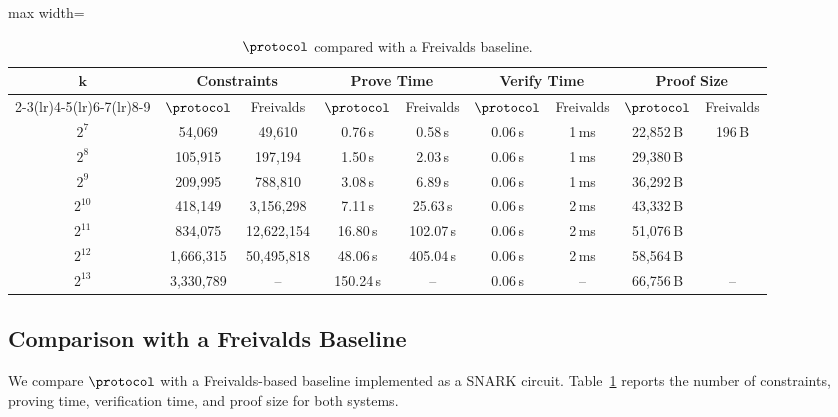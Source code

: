 \begin{table}[!t]
\centering
\setlength{\tabcolsep}{3.5pt}
\begin{adjustbox}{max width=\textwidth}
\begin{tabular}{c cc cc cc cc}
\toprule
\multirow{2}{*}{\(\boldsymbol{k}\)}
& \multicolumn{2}{c}{\textbf{Constraints}}
& \multicolumn{2}{c}{\textbf{Prove Time}}
& \multicolumn{2}{c}{\textbf{Verify Time}}
& \multicolumn{2}{c}{\textbf{Proof Size}} \\
\cmidrule(lr){2-3}\cmidrule(lr){4-5}\cmidrule(lr){6-7}\cmidrule(lr){8-9}
& \(\protocol\) & Freivalds
& \(\protocol\) & Freivalds
& \(\protocol\) & Freivalds
& \(\protocol\) & Freivalds \\
\midrule
$2^7$    & 54{,}069      & 49{,}610       & 0.76\,s   & 0.58\,s   & 0.06\,s & 1\,ms & 22{,}852\,B & \multirow{6}{*}{196\,B} \\
$2^8$    & 105{,}915     & 197{,}194      & 1.50\,s   & 2.03\,s   & 0.06\,s & 1\,ms & 29{,}380\,B & \\
$2^9$    & 209{,}995     & 788{,}810      & 3.08\,s   & 6.89\,s   & 0.06\,s & 1\,ms & 36{,}292\,B & \\
$2^{10}$ & 418{,}149     & 3{,}156{,}298  & 7.11\,s   & 25.63\,s  & 0.06\,s & 2\,ms & 43{,}332\,B & \\
$2^{11}$ & 834{,}075     & 12{,}622{,}154 & 16.80\,s  & 102.07\,s & 0.06\,s & 2\,ms & 51{,}076\,B & \\
$2^{12}$ & 1{,}666{,}315 & 50{,}495{,}818 & 48.06\,s  & 405.04\,s & 0.06\,s & 2\,ms & 58{,}564\,B & \\
$2^{13}$ & 3{,}330{,}789 & --             & 150.24\,s & --        & 0.06\,s & --    & 66{,}756\,B & -- \\
\bottomrule
\end{tabular}
\end{adjustbox}
\vspace{6pt}
\caption{\(\protocol\) compared with a Freivalds baseline.}
\label{tab:lamp-vs-freivalds}
\end{table}


\subsection{Comparison with a Freivalds Baseline}
\label{sec:eval-freivalds}
We compare \(\protocol\) with a Freivalds-based baseline implemented as a
SNARK circuit. Table~\ref{tab:lamp-vs-freivalds} reports the number of
constraints, proving time, verification time, and proof size for both systems.

